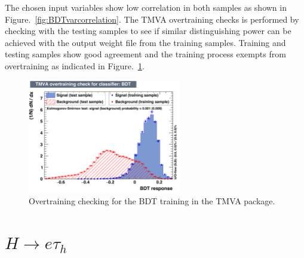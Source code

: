The chosen input variables show low correlation in both samples as shown in Figure.~\ref{fig:BDTvarcorrelation}. The TMVA overtraining checks is performed by checking with the testing samples to see if similar distinguishing power can be achieved with the output weight file from the training samples. Training and testing samples show good agreement and the training process exempts from overtraining as indicated in Figure.~\ref{fig:BDTovertraining}.
\begin{figure}[htbp] 
\centering
\includegraphics[width=0.6\textwidth]{chapter5/overtrain_BDT.pdf}
\caption{Overtraining checking for the BDT training in the TMVA package.}
\label{fig:BDTovertraining}
\end{figure}

\section{\texorpdfstring{$H\rightarrow e \tau_h$}{Lg}}

